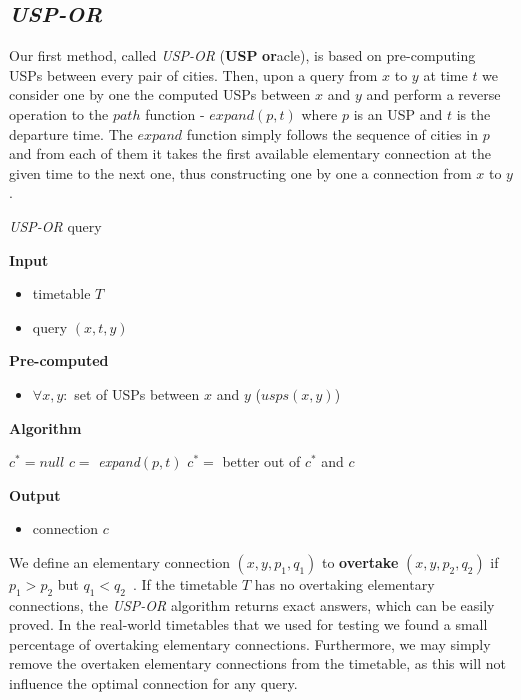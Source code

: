 \documentclass{svk_long_en}
\begin{document}
	\subsection{\textit{USP-OR}}
	
		Our first method, called \textit{USP-OR} (\textbf{USP} \textbf{or}acle), is based on pre-computing USPs between every pair of cities. Then, upon a query from $x$ to $y$ at time $t$ we consider one by one the computed USPs between $x$ and $y$ and perform a reverse operation to the $path$ function - $expand(p, t)$ where $p$ is an USP and $t$ is the departure time. The $expand$ function simply follows the sequence of cities in $p$ and from each of them it takes the first available elementary connection at the given time to the next one, thus constructing one by one a connection from $x$ to $y$. 
		
		\color{algcolor}
		\begin{algorithm}[H]
			\color{inalgcolor}
			\caption{\textit{USP-OR} query}
			\label{alg:uspor-query}
			\textbf{Input} 
			\begin{itemize}
				\item timetable $T$
				\item query $(x, t, y)$
			\end{itemize}
			\textbf{Pre-computed} 
			\begin{itemize}
				\item $\forall x, y:$ set of USPs between $x$ and $y$ ($usps(x, y)$)
			\end{itemize}
			\textbf{Algorithm}
			\begin{algorithmic}
				\STATE $c^{*} = null$
					\STATE $c =$ \textit{expand}$(p, t)$
					\STATE $c^{*} =$ better out of $c^{*}$ and $c$
				\ENDFOR
			\end{algorithmic}
			\textbf{Output}
			\begin{itemize}
				\item connection $c$
			\end{itemize}
		\end{algorithm}
		\color{black}

		We define an elementary connection $(x, y, p_{1}, q_{1})$ to \textbf{overtake} $(x, y, p_{2}, q_{2})$ if $p_{1} > p_{2}$ but $q_{1} < q_{2}$~\cite{tdroute09}. If the timetable $T$ has no overtaking elementary connections, the \textit{USP-OR} algorithm returns exact answers, which can be easily proved. In the real-world timetables that we used for testing we found a small percentage of overtaking elementary connections. Furthermore, we may simply remove the overtaken elementary connections from the timetable, as this will not influence the optimal connection for any query. \\
		
\end{document}

